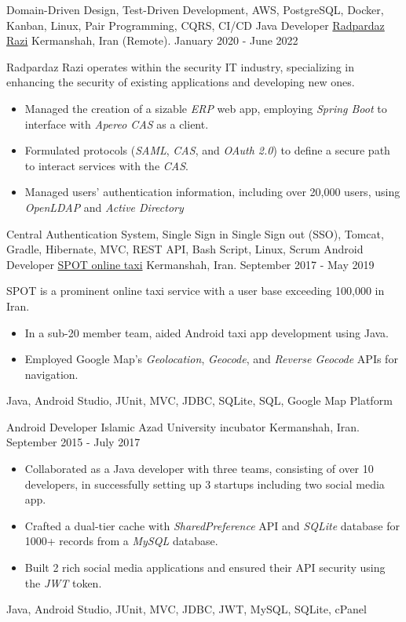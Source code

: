 \begin{experiences}
{\begin{itemize}
   \end{itemize}}{Domain-Driven Design, Test-Driven Development, AWS, PostgreSQL, Docker, Kanban, Linux, Pair Programming, CQRS, CI/CD}
  \emptySeparator 
\experience
{}
{Java Developer}
{\href{https://raadpardaz.ir/}{Radpardaz Razi}}
{Kermanshah, Iran {\scriptsize{(Remote)}}. \hspace{150 pt} January 2020 - June 2022}
{}
{
\par{Radpardaz Razi operates within the security IT industry, specializing in enhancing the security of existing applications and developing new ones.}
\begin{itemize}
\item Managed the creation of a sizable \emph{ERP} web app, employing \emph{Spring Boot} to interface with \emph{Apereo CAS} as a client.
\item Formulated protocols (\emph{SAML}, \emph{CAS}, and \emph{OAuth 2.0}) to define a secure path to interact services with the \textit{CAS}.
\item Managed users' authentication information, including over 20,000 users, using \emph{OpenLDAP} and \emph{Active Directory}
\end{itemize}
}{Central Authentication System, Single Sign in Single Sign out (SSO), Tomcat, Gradle, Hibernate, MVC, REST API, Bash Script, Linux, Scrum}
\emptySeparator
\experience
  {}
  {Android Developer}
  {\href{https://www.spotbar.ir/}{SPOT online taxi}}
  {Kermanshah, Iran. \hspace{140 pt} September 2017 - May 2019}
  {}
  {
  SPOT is a prominent online taxi service with a user base exceeding 100,000 in Iran. 
  \begin{itemize}
    \item In a sub-20 member team, aided Android taxi app development using Java.
    \item Employed Google Map's \emph{Geolocation}, \emph{Geocode}, and \emph{Reverse Geocode} APIs for navigation.\end{itemize}
  }{Java, Android Studio, JUnit, MVC, JDBC, SQLite, SQL, Google Map Platform}

\emptySeparator

\experience
{}
{Android Developer}
{Islamic Azad University incubator}
{Kermanshah, Iran. \hspace{60 pt} September 2015 - July 2017}
{}
{
\begin{itemize}
\item Collaborated as a Java developer with three teams, consisting of over 10 developers, in successfully setting up 3 startups including two social media app.
\item Crafted a dual-tier cache with \emph{SharedPreference} API and \emph{SQLite} database for 1000+ records from a \emph{MySQL} database.
\item Built 2 rich social media applications and ensured their API security using the \emph{JWT} token.
\end{itemize}
}{Java, Android Studio, JUnit, MVC, JDBC, JWT, MySQL, SQLite, cPanel}
\end{experiences}